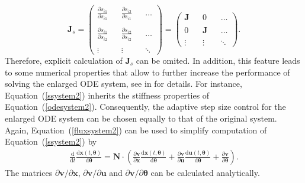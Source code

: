\documentclass[12pt,a4paper]{scrartcl}
\newcommand{\dd}[2]{\frac{\partial #1}{\partial #2}}
\newcommand{\DD}[2]{\frac{\mathrm{d} #1}{\mathrm{d} #2}}
\begin{document}
\begin{displaymath}
\mathbf{J}_s = \left( 
\begin{array}{ccccc}
\dd{s_{i1}}{s_{i1}} & & \dd{s_{i2}}{s_{i1}} & & \ldots \\
\\
\dd{s_{i1}}{s_{i2}} & & \dd{s_{i2}}{s_{i2}}& & \ldots \\
\\
\vdots & & \vdots & & \ddots
\end{array} 
\right) = \left( 
\begin{array}{ccccc}
\mathbf{J} & & 0 & & \ldots \\
\\
0 & & \mathbf{J}& & \ldots \\
\\
\vdots & & \vdots & & \ddots
\end{array} 
\right).
\end{displaymath}
Therefore, explicit calculation of $\mathbf{J}_s$ can be omited. In addition, this feature 
leads to some numerical properties that allow to further increase the performance of 
solving the enlarged ODE system, see in \cite{Hindmarsh:2005fb} for details. For instance, 
Equation~(\ref{ssystem2}) inherits the stiffness properties of Equation~(\ref{odesystem2}). 
Consequently, the adaptive step size control for the enlarged ODE system can be chosen 
equally to that of the original system. Again, Equation~(\ref{fluxsystem2}) can be used to 
simplify computation of Equation~(\ref{ssystem2}) by 
\begin{eqnarray}
	\DD{}{t} \DD{\mathbf{x}(t,\boldsymbol{\theta})}{\boldsymbol{\theta}}  =  \mathbf{N}
\cdot \left(  \dd{\mathbf{v}}{\mathbf{x}}  \DD{\mathbf{x}(t,\boldsymbol{\theta})}
{\boldsymbol{\theta}} +  \dd{\mathbf{v}}{\mathbf{u}}  \DD{\mathbf{u}(t,\boldsymbol{\theta})}
{\boldsymbol{\theta}} + \dd{\mathbf{v}}{\boldsymbol{\theta}} \right). \label{ssystemflux}
\end{eqnarray}
The matrices $\partial{\mathbf{v}}/\partial{\mathbf{x}}$, $\partial{\mathbf{v}}/
\partial{\mathbf{u}}$ and $\partial{\mathbf{v}}/\partial{\boldsymbol{\theta}}$ can be 
calculated analytically.

\renewcommand{\bibname}{References}
\renewcommand{\bibfont}{\small}


\end{document}
